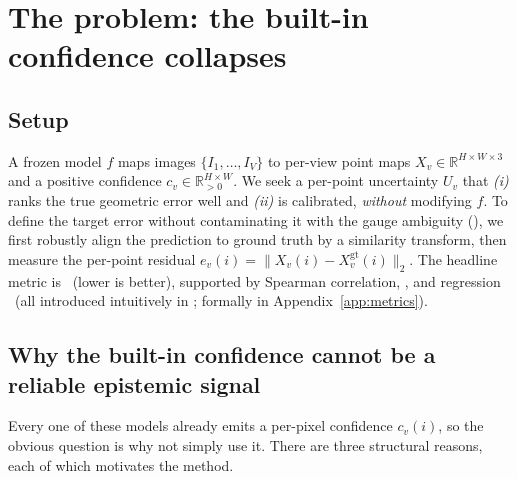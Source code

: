 \section{The problem: the built-in confidence collapses}
\label{sec:rq1}

\subsection{Setup}
\label{sec:problem-setup}

A frozen model $f$ maps images $\{I_1,\dots,I_V\}$ to per-view point maps
$X_v\in\mathbb{R}^{H\times W\times 3}$ and a positive confidence
$c_v\in\mathbb{R}^{H\times W}_{>0}$. We seek a per-point uncertainty $U_v$ that \emph{(i)} ranks the
true geometric error well and \emph{(ii)} is calibrated, \emph{without} modifying $f$. To define the
target error without contaminating it with the gauge ambiguity (), we first
robustly align the prediction to ground truth by a similarity transform, then measure the per-point
residual $e_v(i)=\lVert X_v(i)-X^{\mathrm{gt}}_v(i)\rVert_2$. The headline metric is \ause\ (lower is
better), supported by Spearman correlation, \aurg, and regression \ece\ (all introduced intuitively
in ; formally in Appendix~\ref{app:metrics}).

\subsection{Why the built-in confidence cannot be a reliable epistemic signal}
\label{sec:problem-why}

Every one of these models already emits a per-pixel confidence $c_v(i)$, so the obvious question is
why not simply use it. There are three structural reasons, each of which motivates the method.

